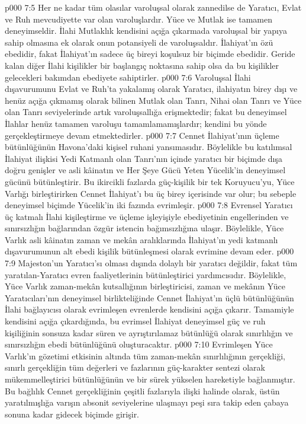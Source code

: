 \vs p000 7:5 Her ne kadar tüm olasılar varoluşsal olarak zannedilse de Yaratıcı, Evlat ve Ruh mevcudiyette var olan varoluşlardır. Yüce ve Mutlak ise tamamen deneyimseldir. İlahi Mutlaklık kendisini açığa çıkarmada varoluşsal bir yapıya sahip olmasına ek olarak onun potansiyeli de varoluşsaldır. İlahiyat’ın özü ebedidir, fakat İlahiyat’ın sadece üç bireyi koşulsuz bir biçimde ebedidir. Geride kalan diğer İlahi kişilikler bir başlangıç noktasına sahip olsa da bu kişilikler gelecekleri bakımdan ebediyete sahiptirler.
\vs p000 7:6 Varoluşsal İlahi dışavurumunu Evlat ve Ruh’ta yakalamış olarak Yaratıcı, ilahiyatın birey dışı ve henüz açığa çıkmamış olarak bilinen Mutlak olan Tanrı, Nihai olan Tanrı ve Yüce olan Tanrı seviyelerinde artık varoluşsallığa erişmektedir; fakat bu deneyimsel İlahlar henüz tamamen varoluşu tamamlamamışlardır; kendini bu yönde gerçekleştirmeye devam etmektedirler.
\vs p000 7:7  Cennet İlahiyat’ının üçleme bütünlüğünün Havona’daki kişisel ruhani yansımasıdır. Böylelikle bu katılımsal İlahiyat ilişkisi Yedi Katmanlı olan Tanrı’nın içinde yaratıcı bir biçimde dışa doğru genişler ve asli kâinatın ve Her Şeye Gücü Yeten Yücelik’in deneyimsel gücünü bütünleştirir. Bu ikircikli fazlarda güç\hyp{}kişilik bir tek Koruyucu’yu, Yüce Varlığı birleştirirken Cennet İlahiyat’ı bu üç birey içerisinde var olur; bu sebeple deneyimsel biçimde Yücelik’in iki fazında evrimleşir.
\vs p000 7:8 Evrensel Yaratıcı üç katmalı İlahi kişileştirme ve üçleme işleyişiyle ebediyetinin engellerinden ve sınırsızlığın bağlarından özgür istencin bağımsızlığına ulaşır. Böylelikle, Yüce Varlık asli kâinatın zaman ve mekân aralıklarında İlahiyat’ın yedi katmanlı dışavurumunun alt ebedi kişilik bütünleşmesi olarak evrimine devam eder.
\vs p000 7:9 Majeston’un Yaratıcı’sı olması dışında dolaylı bir yaratıcı değildir, fakat tüm yaratılan\hyp{}Yaratıcı evren faaliyetlerinin bütünleştirici yardımcısıdır. Böylelikle, Yüce Varlık zaman\hyp{}mekân kutsallığının birleştiricisi, zaman ve mekânın Yüce Yaratıcıları’nın deneyimsel birlikteliğinde Cennet İlahiyat’ın üçlü bütünlüğünün İlahi bağlayıcısı olarak evrimleşen evrenlerde kendisini açığa çıkarır. Tamamiyle kendisini açığa çıkardığında, bu evrimsel İlahiyat deneyimsel güç ve ruh kişiliğinin sonsuza kadar süren ve ayrıştırılamaz bütünlüğü olarak sınırlılığın ve sınırsızlığın ebedi bütünlüğünü oluşturacaktır.
\vs p000 7:10 Evrimleşen Yüce Varlık’ın gözetimi etkisinin altında tüm zaman\hyp{}mekân sınırlılığının gerçekliği, sınırlı gerçekliğin tüm değerleri ve fazlarının güç\hyp{}karakter sentezi olarak mükemmelleştirici bütünlüğünün ve bir sürek yükselen hareketiyle bağlanmıştır. Bu bağlılık Cennet gerçekliğinin çeşitli fazlarıyla ilişki halinde olarak, üstün yaratılmışlığa varışın absonit seviyelerine ulaşmayı peşi sıra takip eden çabaya sonuna kadar gidecek biçimde girişir.
